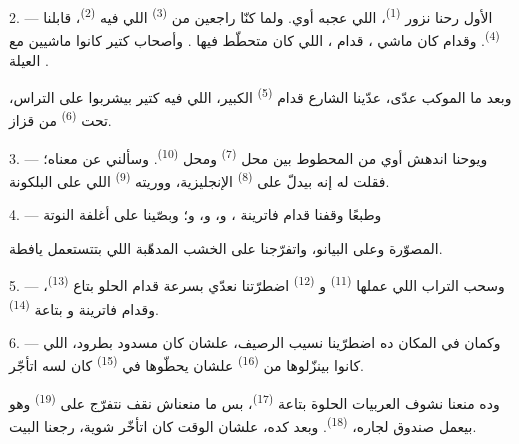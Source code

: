2. --- الأول رحنا نزور  \textsuperscript{(1)}، اللي عجبه أوي. ولما
كنّا راجعين من  \textsuperscript{(3)} اللي فيه  \textsuperscript{(2)}، قابلنا  \textsuperscript{(4)}. وقدام
 كان ماشي ، قدام ،
اللي كان متحطّط فيها . وأصحاب كتير كانوا ماشيين مع العيلة
.

وبعد ما الموكب عدّى، عدّينا الشارع قدام  \textsuperscript{(5)}
الكبير، اللي فيه  كتير بيشربوا  على التراس، تحت
 \textsuperscript{(6)} من قزاز.

3. --- ويوحنا اندهش أوي من  المحطوط بين محل 
\textsuperscript{(7)} ومحل  \textsuperscript{(10)}. وسألني عن
معناه؛ فقلت له إنه بيدلّ على  \textsuperscript{(8)} الإنجليزية،
ووريته  \textsuperscript{(9)} اللي على البلكونة.

\VUsaut{3.0mm}

4. --- وطبعًا وقفنا قدام فاترينة ، و، و، و؛ وبصّينا على أغلفة النوتة

المصوّرة وعلى  البيانو، واتفرّجنا على  الخشب المدهّبة
اللي بتتستعمل يافطة.

5. --- وسحب التراب اللي عملها  \textsuperscript{(11)}
و \textsuperscript{(12)} اضطرّتنا نعدّي بسرعة قدام 
الحلو بتاع  \textsuperscript{(13)}، وقدام فاترينة
 و بتاعة  \textsuperscript{(14)}.

6. --- وكمان في المكان ده اضطرّينا نسيب الرصيف، علشان كان مسدود بطرود، اللي
كانوا بينزّلوها من  \textsuperscript{(16)} علشان يحطّوها في
 \textsuperscript{(15)} كان لسه اتأجّر.

وده منعنا نشوف العربيات الحلوة بتاعة  \textsuperscript{(17)}،
بس ما منعناش نقف نتفرّج على  \textsuperscript{(19)} وهو بيعمل صندوق
لجاره،  \textsuperscript{(18)}. وبعد كده، علشان الوقت كان
اتأخّر شوية، رجعنا البيت.

\VUsaut{3.0mm}


